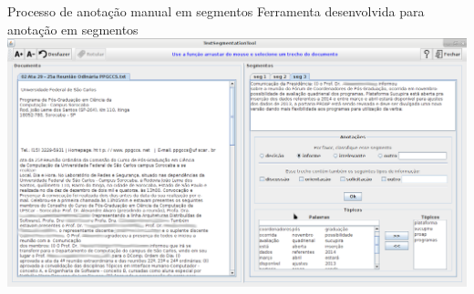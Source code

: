 \documentclass[xcolor=table]{beamer}
\begin{document}
\begin{frame}{Processo de anotação manual em segmentos}
	\center Ferramenta desenvolvida para anotação em segmentos\\
	\vspace{.5cm}
		\includegraphics[width=\textwidth]{images/interface-TST.png}
\end{frame}
\end{document}
